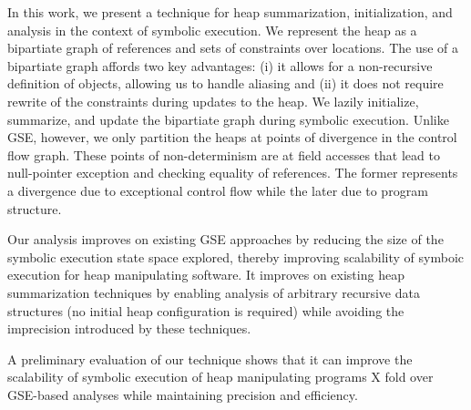 In this work, we present a technique for heap summarization,
initialization, and analysis in the context of symbolic execution. We
represent the heap as a bipartiate graph of references and sets of
constraints over locations. The use of a bipartiate graph affords two
key advantages: (i) it allows for a non-recursive definition of
objects, allowing us to handle aliasing and (ii) it does not require
rewrite of the constraints during updates to the heap. We lazily
initialize, summarize, and update the bipartiate graph during symbolic
execution. Unlike GSE, however, we only partition the heaps at points
of divergence in the control flow graph. These points of
non-determinism are at field accesses that lead to null-pointer
exception and checking equality of references. The former represents a
divergence due to exceptional control flow while the later due to
program structure.



 Our analysis improves on existing GSE approaches by reducing
the size of the symbolic execution state space explored, thereby
improving scalability of symboic execution for heap manipulating
software. It improves on existing heap summarization techniques by
enabling analysis of arbitrary recursive data structures (no initial
heap configuration is required) while avoiding the imprecision
introduced by these techniques.

  A preliminary evaluation of our technique
shows that it can improve the scalability of symbolic execution
of heap manipulating programs X fold over GSE-based analyses
while maintaining precision and efficiency. 

